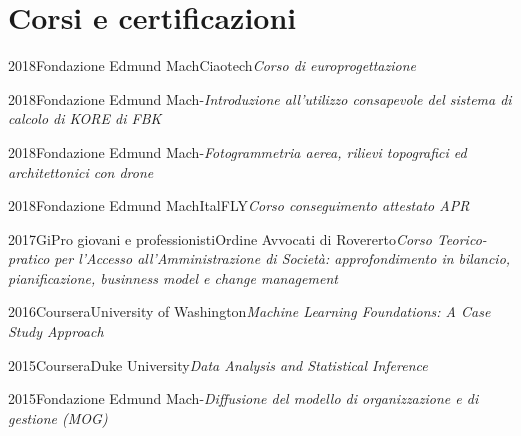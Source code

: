 \documentclass{curriculum}
\begin{document}
    \section{Corsi e certificazioni}
    
    \begin{entrylist}
    \entry
        {2018}{Fondazione Edmund Mach}{Ciaotech}{\emph{Corso di europrogettazione}}
    \end{entrylist}
    
    \begin{entrylist}
    \entry
        {2018}{Fondazione Edmund Mach}{-}{\emph{Introduzione all'utilizzo consapevole del sistema di calcolo di KORE di FBK}}
    \end{entrylist}
    
    \begin{entrylist}
    \entry
        {2018}{Fondazione Edmund Mach}{-}{\emph{Fotogrammetria aerea, rilievi topografici ed architettonici con drone}}
    \end{entrylist}
   
    \begin{entrylist}
    \entry
        {2018}{Fondazione Edmund Mach}{ItalFLY}{\emph{Corso conseguimento attestato APR}}
    \end{entrylist}
    
    \begin{entrylist}
    \entry
        {2017}{GiPro giovani e professionisti}{Ordine Avvocati di Rovererto}{\emph{Corso Teorico-pratico per l'Accesso all'Amministrazione di Società: approfondimento in bilancio, pianificazione, businness model e change management}}
    \end{entrylist} 
    
    \begin{entrylist}
    \entry
        {2016}{Coursera}{University of Washington}{\emph{Machine Learning Foundations: A Case Study Approach}}
    \end{entrylist}
    
    \begin{entrylist}
    \entry
        {2015}{Coursera}{Duke University}{\emph{Data Analysis and Statistical Inference}}
    \end{entrylist}
    
    \begin{entrylist}
    \entry
        {2015}{Fondazione Edmund Mach}{-}{\emph{Diffusione del modello di organizzazione e di gestione (MOG)}}
    \end{entrylist}
    
\end{document}
